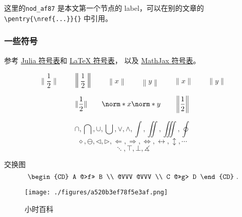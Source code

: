 

这里的\verb`nod_af87` 是本文第一个节点的 label，可以在别的文章的 \verb`\pentry{\nref{...}}{}` 中引用。

\subsubsection{一些符号}
参考 \href{https://docs.julialang.org/en/v1/manual/unicode-input/}{Julia 符号表}和 \href{https://oeis.org/wiki/List_of_LaTeX_mathematical_symbols}{LaTeX 符号表}， 以及 \href{http://www.onemathematicalcat.org/MathJaxDocumentation/TeXSyntax.htm}{MathJax 符号表}。



\begin{equation}
\|\frac12\| \qquad
\left\|\frac12\right\| \qquad
\left\|x\right\| \qquad
\left\|y\right\| \qquad
\|x\| \qquad
\|y\|~
\end{equation}

\begin{equation}
\lVert\frac12\rVert \qquad
\norm*{x} \norm*{y} \qquad
\left\lVert\frac12\right\rVert~
\end{equation}

\begin{equation}
\cap, \bigcap, \cup, \bigcup, \vee, \wedge, \int, \iint, \iiint, \oint~
\end{equation}
\begin{equation}
\diamond, \ominus, \triangleleft, \triangleright, \Longleftarrow, \Longrightarrow, \iff, \leftrightarrow, \updownarrow, \cdots~
\end{equation}
\begin{equation}
\ddots, \top, \bot, \measuredangle~
\end{equation}

交换图
\begin{equation}
\begin{CD}
A @>f>> B \\
@VVV @VVV \\
C @>>g> D
\end{CD}~.
\end{equation}

\begin{figure}[ht]
\centering
\texttt{[image: ./figures/a520b3ef78f5e3af.png]}
\caption{小时百科} \label{fig_test_1}
\end{figure}


